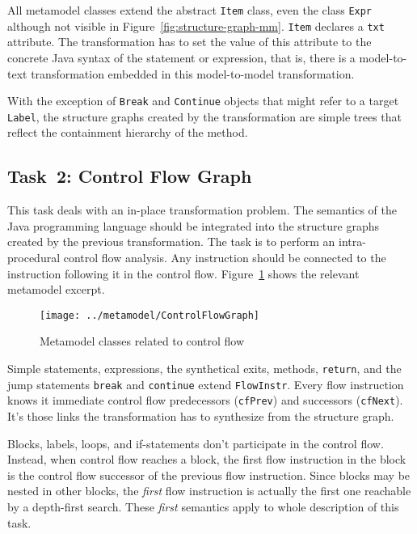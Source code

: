 \documentclass[submission]{eptcs}
\begin{document}
All metamodel classes extend the abstract \verb|Item| class, even the class
\verb|Expr| although not visible in Figure~\ref{fig:structure-graph-mm}.
\verb|Item| declares a \verb|txt| attribute.  The transformation has to set the
value of this attribute to the concrete Java syntax of the statement or
expression, that is, there is a model-to-text transformation embedded in this
model-to-model transformation.

With the exception of \verb|Break| and \verb|Continue| objects that might refer
to a target \verb|Label|, the structure graphs created by the transformation
are simple trees that reflect the containment hierarchy of the method.

\subsection*{Task~2: Control Flow Graph}
\label{sec:task2-cf-graph}

This task deals with an in-place transformation problem.  The semantics of the
Java programming language should be integrated into the structure graphs
created by the previous transformation.  The task is to perform an
intra-procedural control flow analysis.  Any instruction should be connected to
the instruction following it in the control flow.
Figure~\ref{fig:control-flow-mm} shows the relevant metamodel excerpt.

\begin{figure}[h!]
  \centering
  \texttt{[image: ../metamodel/ControlFlowGraph]}
  \caption{Metamodel classes related to control flow}
  \label{fig:control-flow-mm}
\end{figure}

Simple statements, expressions, the synthetical exits, methods, \verb|return|,
and the jump statements \verb|break| and \verb|continue| extend
\verb|FlowInstr|.  Every flow instruction knows it immediate control flow
predecessors (\verb|cfPrev|) and successors (\verb|cfNext|).  It's those links
the transformation has to synthesize from the structure graph.

Blocks, labels, loops, and if-statements don't participate in the control flow.
Instead, when control flow reaches a block, the first flow instruction in the
block is the control flow successor of the previous flow instruction.  Since
blocks may be nested in other blocks, the \emph{first} flow instruction is
actually the first one reachable by a depth-first search.  These \emph{first}
semantics apply to whole description of this task.
\end{document}
